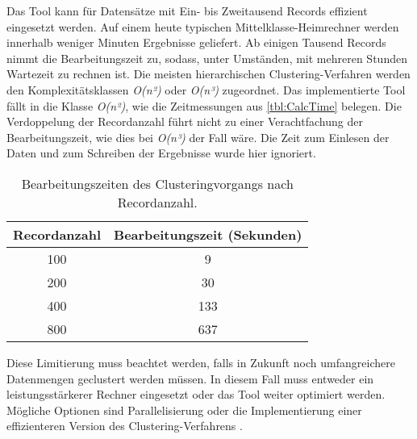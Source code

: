 Das Tool kann für Datensätze mit Ein- bis Zweitausend Records effizient eingesetzt werden.
Auf einem heute typischen Mittelklasse-Heimrechner werden innerhalb weniger Minuten Ergebnisse geliefert.
Ab einigen Tausend Records nimmt die Bearbeitungszeit zu,
sodass, unter Umständen, mit mehreren Stunden Wartezeit zu rechnen ist.
Die meisten hierarchischen Clustering-Verfahren werden den Komplexitätsklassen
\emph{O(n²)} oder \emph{O(n³)} zugeordnet.
Das implementierte Tool fällt in die Klasse \emph{O(n²)},
wie die Zeitmessungen aus \autoref{tbl:CalcTime} belegen.
Die Verdoppelung der Recordanzahl führt nicht zu einer Verachtfachung der Bearbeitungszeit,
wie dies bei \emph{O(n³)} der Fall wäre.
Die Zeit zum Einlesen der Daten
und zum Schreiben der Ergebnisse wurde hier ignoriert.
\begin{table}[ht]
  \begin{center}
  \begin{tabular}{ |c|c| } 
   \hline
   Recordanzahl & Bearbeitungszeit (Sekunden) \\
   \hline \hline
   100 & 9 \\
   \hline
   200 & 30 \\
   \hline
   400 & 133 \\
   \hline
   800 & 637 \\
   \hline
  \end{tabular}
  \caption{Bearbeitungszeiten des Clusteringvorgangs nach Recordanzahl.}
  \label{tbl:CalcTime}
  \end{center}
\end{table}
Diese Limitierung muss beachtet werden,
falls in Zukunft noch umfangreichere Datenmengen geclustert werden müssen.
In diesem Fall muss entweder ein leistungsstärkerer Rechner eingesetzt
oder das Tool weiter optimiert werden.
Mögliche Optionen sind Parallelisierung
oder die Implementierung einer effizienteren Version des Clustering-Verfahrens \citep{patel_study_2015}.

